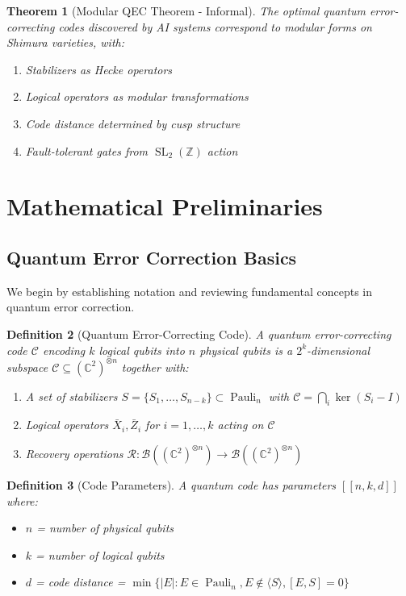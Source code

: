 \documentclass[12pt,a4paper]{article}
\newtheorem{theorem}{Theorem}[section]
\newtheorem{definition}[theorem]{Definition}
\DeclareMathOperator{\SL}{SL}
\DeclareMathOperator{\Pauli}{Pauli}
\newcommand{\bbC}{\mathbb{C}}
\newcommand{\bbZ}{\mathbb{Z}}
\begin{document}
\begin{theorem}[Modular QEC Theorem - Informal]
The optimal quantum error-correcting codes discovered by AI systems correspond to modular forms on Shimura varieties, with:
\begin{enumerate}
\item Stabilizers as Hecke operators
\item Logical operators as modular transformations
\item Code distance determined by cusp structure
\item Fault-tolerant gates from $\SL_2(\bbZ)$ action
\end{enumerate}
\end{theorem}

\section{Mathematical Preliminaries}

\subsection{Quantum Error Correction Basics}

We begin by establishing notation and reviewing fundamental concepts in quantum error correction.

\begin{definition}[Quantum Error-Correcting Code]
A quantum error-correcting code $\mathcal{C}$ encoding $k$ logical qubits into $n$ physical qubits is a $2^k$-dimensional subspace $\mathcal{C} \subseteq (\bbC^2)^{\otimes n}$ together with:
\begin{enumerate}
\item A set of stabilizers $S = \{S_1, \ldots, S_{n-k}\} \subset \Pauli_n$ with $\mathcal{C} = \bigcap_i \ker(S_i - I)$
\item Logical operators $\bar{X}_i, \bar{Z}_i$ for $i = 1, \ldots, k$ acting on $\mathcal{C}$
\item Recovery operations $\mathcal{R}: \mathcal{B}((\bbC^2)^{\otimes n}) \to \mathcal{B}((\bbC^2)^{\otimes n})$
\end{enumerate}
\end{definition}

\begin{definition}[Code Parameters]
A quantum code has parameters $[[n, k, d]]$ where:
\begin{itemize}
\item $n$ = number of physical qubits
\item $k$ = number of logical qubits
\item $d$ = code distance = $\min\{|E| : E \in \Pauli_n, E \notin \langle S \rangle, [E, S] = 0\}$
\end{itemize}
\end{definition}
\end{document}
